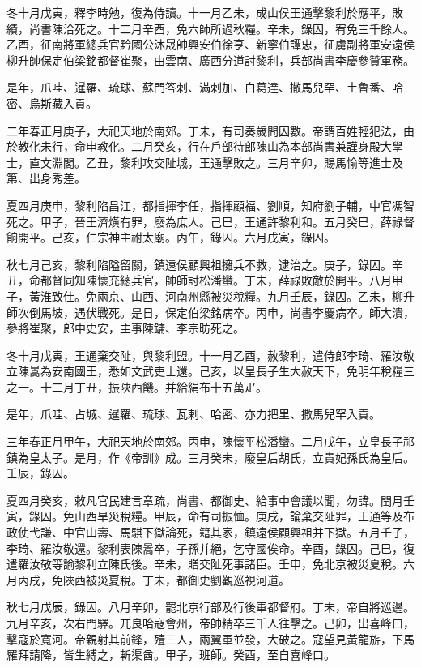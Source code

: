 \begin{pinyinscope}
冬十月戊寅，釋李時勉，復為侍讀。十一月乙未，成山侯王通擊黎利於應平，敗績，尚書陳洽死之。十二月辛酉，免六師所過秋糧。辛未，錄囚，宥免三千餘人。乙酉，征南將軍總兵官黔國公沐晟帥興安伯徐亨、新寧伯譚忠，征虜副將軍安遠侯柳升帥保定伯梁銘都督崔聚，由雲南、廣西分道討黎利，兵部尚書李慶參贊軍務。

是年，爪哇、暹羅、琉球、蘇門答剌、滿剌加、白葛達、撒馬兒罕、土魯番、哈密、烏斯藏入貢。

二年春正月庚子，大祀天地於南郊。丁未，有司奏歲問囚數。帝謂百姓輕犯法，由於教化未行，命申教化。二月癸亥，行在戶部待郎陳山為本部尚書兼謹身殿大學士，直文淵閣。乙丑，黎利攻交阯城，王通擊敗之。三月辛卯，賜馬愉等進士及第、出身秀差。

夏四月庚申，黎利陷昌江，都指揮李任，指揮顧福、劉順，知府劉子輔，中官馮智死之。甲子，晉王濟熿有罪，廢為庶人。己巳，王通許黎利和。五月癸巳，薛祿督餉開平。己亥，仁宗神主祔太廟。丙午，錄囚。六月戊寅，錄囚。

秋七月己亥，黎利陷隘留關，鎮遠侯顧興祖擁兵不救，逮治之。庚子，錄囚。辛丑，命都督同知陳懷充總兵官，帥師討松潘蠻。丁未，薛祿敗敵於開平。八月甲子，黃淮致仕。免兩京、山西、河南州縣被災稅糧。九月壬辰，錄囚。乙未，柳升師次倒馬坡，遇伏戰死。是日，保定伯梁銘病卒。丙申，尚書李慶病卒。師大潰，參將崔聚，郎中史安，主事陳鏞、李宗昉死之。

冬十月戊寅，王通棄交阯，與黎利盟。十一月乙酉，赦黎利，遣侍郎李琦、羅汝敬立陳暠為安南國王，悉如文武吏士還。己亥，以皇長子生大赦天下，免明年稅糧三之一。十二月丁丑，振陜西饑。并給絹布十五萬疋。

是年，爪哇、占城、暹羅、琉球、瓦剌、哈密、亦力把里、撒馬兒罕入貢。

三年春正月甲午，大祀天地於南郊。丙申，陳懷平松潘蠻。二月戊午，立皇長子祁鎮為皇太子。是月，作《帝訓》成。三月癸未，廢皇后胡氏，立貴妃孫氏為皇后。壬辰，錄囚。

夏四月癸亥，敕凡官民建言章疏，尚書、都御史、給事中會議以聞，勿諱。閏月壬寅，錄囚。免山西旱災稅糧。甲辰，命有司振恤。庚戌，論棄交阯罪，王通等及布政使弋謙、中官山壽、馬騏下獄論死，籍其家，鎮遠侯顧興祖并下獄。五月壬子，李琦、羅汝敬還。黎利表陳暠卒，子孫并絕，乞守國俟命。辛酉，錄囚。己巳，復遣羅汝敬等諭黎利立陳氏後。辛未，贈交阯死事諸臣。壬申，免北京被災夏稅。六月丙戌，免陜西被災夏稅。丁未，都御史劉觀巡視河道。

秋七月戊辰，錄囚。八月辛卯，罷北京行部及行後軍都督府。丁未，帝自將巡邊。九月辛亥，次右門驛。兀良哈寇會州，帝帥精卒三千人往擊之。己卯，出喜峰口，擊寇於寬河。帝親射其前鋒，殪三人，兩翼軍並發，大破之。寇望見黃龍旂，下馬羅拜請降，皆生縛之，斬渠酋。甲子，班師。癸酉，至自喜峰口。


\end{pinyinscope}
